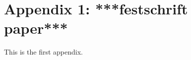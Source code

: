 \chapter{Appendix 1: ***festschrift paper***}
\label{cha:festschrift}

This is the first appendix.




